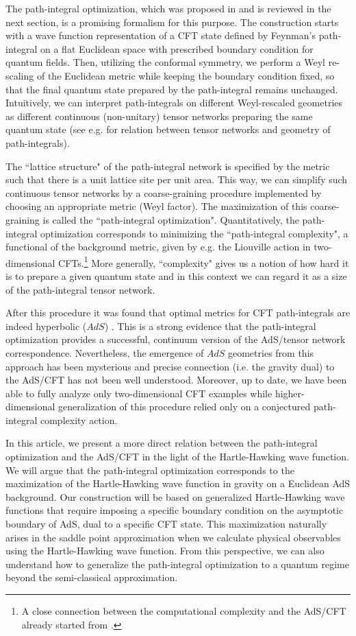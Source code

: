 \documentclass[a4paper,12pt]{article}
\begin{document}
The path-integral optimization, which was proposed in \cite{Caputa:2017urj} and is reviewed in the next section, is a promising formalism for this purpose. The construction starts with a wave function representation of a CFT state defined by Feynman's path-integral on a flat Euclidean space with prescribed boundary condition for quantum fields.  
Then, utilizing the conformal symmetry, we perform a Weyl re-scaling of the Euclidean metric while keeping the boundary condition fixed, so that the final quantum state prepared by the path-integral remains unchanged. Intuitively, we can interpret path-integrals on different Weyl-rescaled geometries as different continuous (non-unitary) tensor networks preparing the same quantum state (see e.g. \cite{Milsted:2018yur} for relation between tensor networks and geometry of path-integrals). 

The ``lattice structure" of the path-integral network is specified by the metric such that there is a unit lattice site per unit area. This way, we can simplify such continuous tensor networks by a coarse-graining procedure implemented by choosing an appropriate metric (Weyl factor). The maximization of this coarse-graining is called the ``path-integral optimization". Quantitatively, the path-integral optimization corresponds to minimizing the ``path-integral complexity", a functional of the background metric, given by e.g. the Liouville action in two-dimensional CFTs.\footnote{A close connection between the computational complexity and the AdS/CFT already started from \cite{Susskind}.} More generally, ``complexity" gives us a notion of how hard it is to prepare a given quantum state and in this context we can regard it as a size of the path-integral tensor network.  

After this procedure it was found that optimal metrics for CFT path-integrals are indeed hyperbolic ($AdS$) \cite{Caputa:2017urj}. This is a strong evidence that the path-integral optimization provides a successful, continuum version of the AdS/tensor network correspondence. Nevertheless, the emergence of $AdS$ geometries from this approach has been mysterious and precise connection (i.e. the gravity dual) to the AdS/CFT has not been well understood. Moreover, up to date, we have been able to fully analyze only two-dimensional CFT examples while higher-dimensional generalization of this procedure relied only on a conjectured path-integral complexity action.

In this article, we present a more direct relation between the path-integral optimization and the AdS/CFT in the light of the Hartle-Hawking wave function. We will argue that the path-integral optimization corresponds to the maximization of the Hartle-Hawking wave function in gravity on a Euclidean AdS background. Our construction will be based on generalized Hartle-Hawking wave functions that require imposing a specific boundary condition on the asymptotic boundary of AdS, dual to a specific CFT state. This maximization naturally arises in the saddle point approximation when we calculate physical observables using the Hartle-Hawking wave function. From this perspective, we can also understand how to generalize the path-integral optimization to a quantum regime beyond the semi-classical approximation. 
\end{document}
